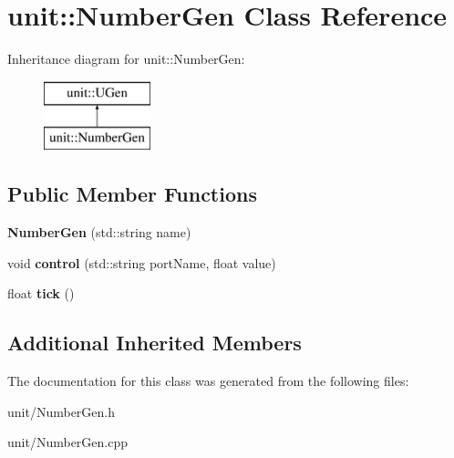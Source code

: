 \hypertarget{classunit_1_1NumberGen}{}\section{unit\+:\+:Number\+Gen Class Reference}
\label{classunit_1_1NumberGen}
Inheritance diagram for unit\+:\+:Number\+Gen\+:\begin{figure}[H]
\begin{center}
\leavevmode
\includegraphics[height=2.000000cm]{classunit_1_1NumberGen}
\end{center}
\end{figure}
\subsection*{Public Member Functions}
\begin{DoxyCompactItemize}
\item 
{\bfseries Number\+Gen} (std\+::string name)\hypertarget{classunit_1_1NumberGen_a6e93812c4805a43f19f8fb11680e32a4}{}\label{classunit_1_1NumberGen_a6e93812c4805a43f19f8fb11680e32a4}

\item 
void {\bfseries control} (std\+::string port\+Name, float value)\hypertarget{classunit_1_1NumberGen_a9daaaf8a12389873494bb1ad2f877c8c}{}\label{classunit_1_1NumberGen_a9daaaf8a12389873494bb1ad2f877c8c}

\item 
float {\bfseries tick} ()\hypertarget{classunit_1_1NumberGen_a38cef7d64a12e40bf2ae14f29def41ca}{}\label{classunit_1_1NumberGen_a38cef7d64a12e40bf2ae14f29def41ca}

\end{DoxyCompactItemize}
\subsection*{Additional Inherited Members}


The documentation for this class was generated from the following files\+:\begin{DoxyCompactItemize}
\item 
unit/Number\+Gen.\+h\item 
unit/Number\+Gen.\+cpp\end{DoxyCompactItemize}
